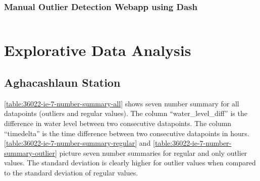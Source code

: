 
\subsubsection{Manual Outlier Detection Webapp using Dash} 
\inputminted[linenos]{python}{./code/manual_outlier_detection.py}

\section{Explorative Data Analysis}
\subsection{Aghacashlaun Station}

\autoref{table:36022-ie-7-number-summary-all} shows seven number summary for all datapoints (outliers and regular values). The column ``water\_level\_diff'' is the difference in water level between two consecutive datapoints. The column ``timedelta'' is the time difference between two consecutive datapoints in hours. \autoref{table:36022-ie-7-number-summary-regular} and \autoref{table:36022-ie-7-number-summary-outlier} picture seven number summaries for regular and only outlier values. The standard deviation is clearly higher for outlier values when compared to the standard deviation of regular values.




